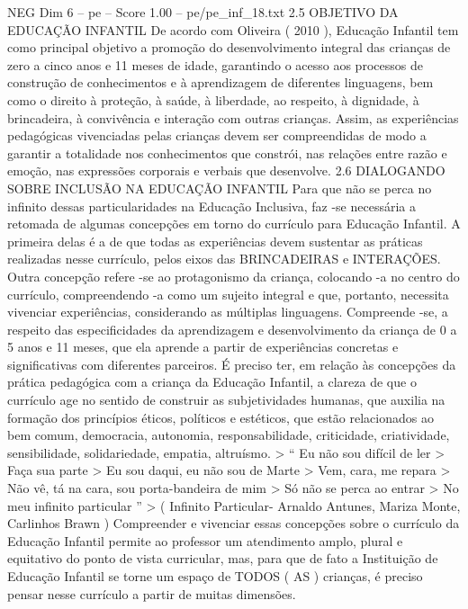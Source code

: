 \begin{textsample}{NEG Dim 6 – pe – Score 1.00 – pe/pe\_inf\_18.txt}  \label{ex:f6_neg_039}
2.5 OBJETIVO DA EDUCAÇÃO INFANTIL De acordo com Oliveira ( 2010 ), Educação Infantil tem como principal objetivo a promoção do desenvolvimento integral das crianças de zero a cinco anos e 11 meses de idade, garantindo o acesso aos processos de construção de conhecimentos e à aprendizagem de diferentes linguagens, bem como o direito à proteção, à saúde, à liberdade, ao respeito, à dignidade, à brincadeira, à convivência e interação com outras crianças.
Assim, as experiências pedagógicas vivenciadas pelas crianças devem ser compreendidas de modo a garantir a totalidade nos conhecimentos que constrói, nas relações entre razão e emoção, nas expressões corporais e verbais que desenvolve. 2.6 DIALOGANDO SOBRE INCLUSÃO NA EDUCAÇÃO INFANTIL Para que não se perca no infinito dessas particularidades na Educação Inclusiva, faz -se necessária a retomada de algumas concepções em torno do currículo para Educação Infantil.
A primeira delas é a de que todas as experiências devem sustentar as práticas realizadas nesse currículo, pelos eixos das BRINCADEIRAS e INTERAÇÕES.
Outra concepção refere -se ao protagonismo da criança, colocando -a no centro do currículo, compreendendo -a como um sujeito integral e que, portanto, necessita vivenciar experiências, considerando as múltiplas linguagens.
Compreende -se, a respeito das especificidades da aprendizagem e desenvolvimento da criança de 0 a 5 anos e 11 meses, que ela aprende a partir de experiências concretas e significativas com diferentes parceiros.
É preciso ter, em relação às concepções da prática pedagógica com a criança da Educação Infantil, a clareza de que o currículo age no sentido de construir as subjetividades humanas, que auxilia na formação dos princípios éticos, políticos e estéticos, que estão relacionados ao bem comum, democracia, autonomia, responsabilidade, criticidade, criatividade, sensibilidade, solidariedade, empatia, altruísmo. > “ Eu não sou difícil de ler > Faça sua parte > Eu sou daqui, eu não sou de Marte > Vem, cara, me repara > Não vê, tá na cara, sou porta-bandeira de mim > Só não se perca ao entrar > No meu infinito particular ” > ( Infinito Particular- Arnaldo Antunes, Mariza Monte, Carlinhos Brawn ) Compreender e vivenciar essas concepções sobre o currículo da Educação Infantil permite ao professor um atendimento amplo, plural e equitativo do ponto de vista curricular, mas, para que de fato a Instituição de Educação Infantil se torne um espaço de TODOS ( AS ) crianças, é preciso pensar nesse currículo a partir de muitas dimensões.

\end{textsample}
